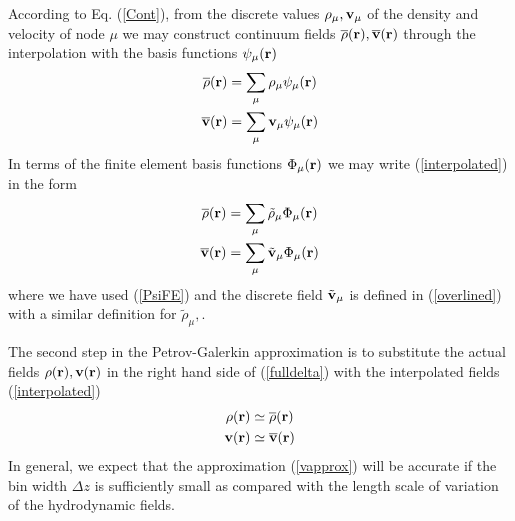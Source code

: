 \documentclass[b5paper,openright,11pt]{book}
\begin{document}
According  to Eq.  (\ref{Cont}), from  the discrete  values $\rho_\mu,
{\bf  v}_\mu$  of the  density  and  velocity  of  node $\mu$  we  may
construct  continuum  fields  $\overline{\rho}({\bf  r}),\overline{\bf
  v}({\bf  r})$ through  the  interpolation with  the basis  functions
$\psi_\mu({\bf r})$
\begin{align}
\overline{\rho}({\bf r})&=\sum_\mu{\rho}_\mu\psi_\mu({\bf r})
\nonumber\\
\overline{\bf  v}({\bf r})&=\sum_\mu{\bf v}_\mu \psi_\mu({\bf r})
\label{interpolated}
\end{align}
In terms of  the finite element basis functions $\Phi_\mu({\bf r})$ we may write
(\ref{interpolated})  in the form 
\begin{align}
\overline{\rho}({\bf r})&=\sum_\mu\tilde{\rho}_\mu\Phi_\mu({\bf r})
\nonumber\\
\overline{\bf  v}({\bf r})&= \sum_\mu\tilde{\bf v}_\mu\Phi_\mu({\bf r})
\label{interpolated2}
\end{align}
where  we  have  used  (\ref{PsiFE})   and  the   discrete  field
$\tilde{\bf  v}_\mu$ is  defined in  (\ref{overlined}) with  a similar
definition for $\tilde{\rho}_\mu,$.

The second step in the  Petrov-Galerkin approximation is to substitute
the actual fields $\rho({\bf r}), {\bf  v}({\bf r})$ in the right hand
side    of   (\ref{fulldelta})    with    the   interpolated    fields
(\ref{interpolated})
\begin{align}
 {\rho}({\bf r})&\simeq \overline{\rho}({\bf r})
\nonumber\\
 {\bf v}({\bf r})&\simeq \overline{\bf v}({\bf r})
\label{vapprox}
\end{align}
In general, we  expect that the approximation  (\ref{vapprox}) will be
accurate if the bin width $\Delta z$ is sufficiently small as compared
with  the  length  scale  of variation  of  the  hydrodynamic  fields.
\end{document}
